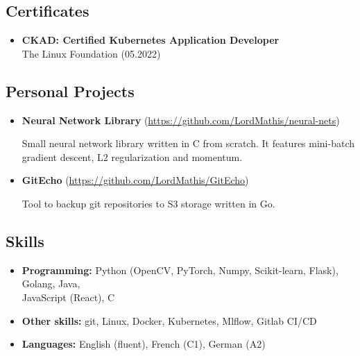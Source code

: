 \documentclass[a4paper,12pt]{article}
\begin{document}
{\color{myblue}
\subsection*{Certificates}\label{certificates}
}
\begin{itemize}
    \item   
    \textbf{CKAD: Certified Kubernetes Application Developer}\\
     The Linux Foundation \hfill (05.2022)
\end{itemize}

{\color{myblue}
\subsection*{Personal Projects}\label{projects}
}
\begin{itemize}
\item
    \textbf{Neural Network Library} (\href{https://github.com/LordMathis/neural-nets}{https://github.com/LordMathis/neural-nets})

    Small neural network library written in C from scratch. It features mini-batch gradient descent, L2 regularization and momentum.

\item 
    \textbf{GitEcho} (\href{https://github.com/LordMathis/GitEcho}{https://github.com/LordMathis/GitEcho})

    Tool to backup git repositories to S3 storage written in Go.
\end{itemize}

{\color{myblue}
\subsection*{Skills}\label{skills}
}
\begin{itemize}
\setlength\itemsep{0.2em} %
\item
  \textbf{Programming:} Python (OpenCV, PyTorch, Numpy, Scikit-learn, Flask), Golang, Java, \\ JavaScript (React), C
\item
  \textbf{Other skills:} git, Linux, Docker, Kubernetes, Mlflow, Gitlab CI/CD
\item
  \textbf{Languages:} English (fluent), French (C1), German (A2)
\end{itemize}
\end{document}
